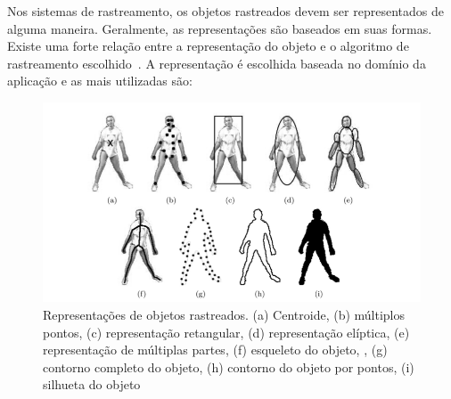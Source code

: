 	Nos sistemas de rastreamento, os objetos rastreados devem ser representados de alguma maneira. Geralmente, as representações são baseados em suas formas. Existe uma forte relação entre a representação do objeto e o algoritmo de rastreamento escolhido~\cite{yilmaz}. A representação é escolhida baseada no domínio da aplicação e as mais utilizadas são:

	\begin{figure}[hbt]
		\begin{center}
			\includegraphics[scale=0.5]{figuras/2.FundamentacaoTeorica/representacao.png}
		\end{center}
		\caption{Representações de objetos rastreados. (a) Centroide, (b) múltiplos pontos, (c) representação retangular, (d) representação elíptica, (e) representação de múltiplas partes, (f) esqueleto do objeto, , (g) contorno completo do objeto, (h) contorno do objeto por pontos, (i) silhueta do objeto~\cite{yilmaz}}
		\label{representacao}
	\end{figure}

